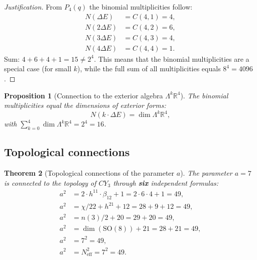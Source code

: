 \documentclass[11pt,a4paper]{article}
\newcommand{\SO}{\ensuremath{\mathrm{SO}}}
\newcommand{\CY}{\ensuremath{CY_3}}
\newtheorem{theorem}{Theorem}[section]
\newtheorem{proposition}[theorem]{Proposition}
\theoremstyle{definition}
\begin{document}
\begin{proof}[Justification]
From $P_4(q)$ the binomial multiplicities follow:
\begin{align}
    N(\Delta E) &= C(4, 1) = 4, \\
    N(2\Delta E) &= C(4, 2) = 6, \\
    N(3\Delta E) &= C(4, 3) = 4, \\
    N(4\Delta E) &= C(4, 4) = 1.
\end{align}
Sum: $4 + 6 + 4 + 1 = 15 \neq 2^4$. This means that the
binomial multiplicities are a special case (for small $k$),
while the full sum of all multiplicities equals $8^4 = 4096$.
\end{proof}

\begin{proposition}[Connection to the exterior algebra $\Lambda^k \mathbb{R}^4$]
\label{prop:membrane-lambda}
The binomial multiplicities equal the dimensions of exterior forms:
\begin{equation}
    N(k \cdot \Delta E) = \dim \Lambda^k \mathbb{R}^4,
\end{equation}
with $\sum_{k=0}^{4} \dim \Lambda^k \mathbb{R}^4 = 2^4 = 16$.
\end{proposition}

\subsection{Topological connections}
\label{subsec:membrane-topology}

\begin{theorem}[Topological connections of the parameter $a$]
\label{thm:membrane-topology}
The parameter $a = 7$ is connected to the topology of $\CY$ through \textbf{six}
independent formulas:
\begin{align}
    a^2 &= 2 \cdot h^{11} \cdot \beta_{12} + 1 = 2 \cdot 6 \cdot 4 + 1 = 49,
    \label{eq:membrane-a2-1} \\
    a^2 &= \chi/22 + h^{21} + 12 = 28 + 9 + 12 = 49,
    \label{eq:membrane-a2-2} \\
    a^2 &= n(3)/2 + 20 = 29 + 20 = 49,
    \label{eq:membrane-a2-3} \\
    a^2 &= \dim(\SO(8)) + 21 = 28 + 21 = 49,
    \label{eq:membrane-a2-4} \\
    a^2 &= 7^2 = 49,
    \label{eq:membrane-a2-5} \\
    a^2 &= N_{\text{eff}}^2 = 7^2 = 49.
    \label{eq:membrane-a2-6}
\end{align}
\end{theorem}
\end{document}
